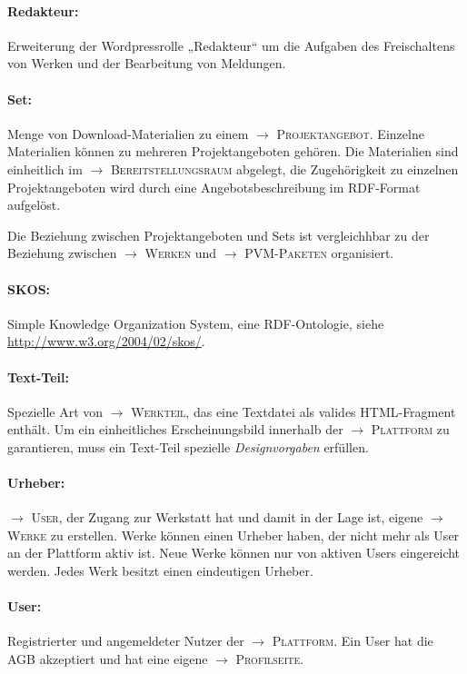 \documentclass[a4paper,11pt]{article}
\newcommand{\glossar}[1]{{$\to$ \textsc{#1}}}
\begin{document}
\paragraph{Redakteur:} 
Erweiterung der Wordpressrolle „Redakteur“ um die Aufgaben des Freischaltens
von Werken und der Bearbeitung von Meldungen.

\paragraph{Set:} 
Menge von Download-Materialien zu einem \glossar{Projektangebot}.  Einzelne
Materialien können zu mehreren Projektangeboten gehören.  Die Materialien sind
einheitlich im \glossar{Bereitstellungsraum} abgelegt, die Zugehörigkeit zu
einzelnen Projektangeboten wird durch eine Angebotsbeschreibung im RDF-Format
aufgelöst.

Die Beziehung zwischen Projektangeboten und Sets ist vergleichhbar zu der
Beziehung zwischen \glossar{Werken} und \glossar{PVM-Paketen} organisiert.

\paragraph{SKOS:} 
Simple Knowledge Organization System, eine RDF-Ontologie, siehe
\url{http://www.w3.org/2004/02/skos/}.

\paragraph{Text-Teil:}
Spezielle Art von \glossar{Werkteil}, das eine Textdatei als valides
HTML-Fragment enthält.  Um ein einheitliches Erscheinungsbild innerhalb der
\glossar{Plattform} zu garantieren, muss ein Text-Teil spezielle
\emph{Designvorgaben} erfüllen.

\paragraph{Urheber:} 
\glossar{User}, der Zugang zur Werkstatt hat und damit in der Lage ist, eigene
\glossar{Werke} zu erstellen.  Werke können einen Urheber haben, der nicht mehr
als User an der Plattform aktiv ist. Neue Werke können nur von aktiven Users
eingereicht werden. Jedes Werk besitzt einen eindeutigen Urheber.

\paragraph{User:} 
Registrierter und angemeldeter Nutzer der \glossar{Plattform}. Ein User hat die
AGB akzeptiert und hat eine eigene \glossar{Profilseite}. 
\end{document}
